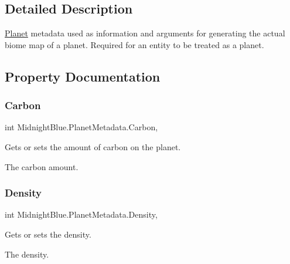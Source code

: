 \subsection{Detailed Description}
\hyperlink{class_midnight_blue_1_1_planet}{Planet} metadata used as information and arguments for generating the actual biome map of a planet. Required for an entity to be treated as a planet. 



\subsection{Property Documentation}
\hypertarget{class_midnight_blue_1_1_planet_metadata_abb8cb39cd167a260d08f505ad038eb90}{}\label{class_midnight_blue_1_1_planet_metadata_abb8cb39cd167a260d08f505ad038eb90} 
\subsubsection{\texorpdfstring{Carbon}{Carbon}}
{\footnotesize\ttfamily int Midnight\+Blue.\+Planet\+Metadata.\+Carbon\hspace{0.3cm}{\ttfamily [get]}, {\ttfamily [set]}}



Gets or sets the amount of carbon on the planet. 

The carbon amount.\hypertarget{class_midnight_blue_1_1_planet_metadata_a6f3fe53543f04e24f107c6464b03d885}{}\label{class_midnight_blue_1_1_planet_metadata_a6f3fe53543f04e24f107c6464b03d885} 
\subsubsection{\texorpdfstring{Density}{Density}}
{\footnotesize\ttfamily int Midnight\+Blue.\+Planet\+Metadata.\+Density\hspace{0.3cm}{\ttfamily [get]}, {\ttfamily [set]}}



Gets or sets the density. 

The density.\hypertarget{class_midnight_blue_1_1_planet_metadata_ada2ca7bb1b67a18098a2fadd7f958ec9}{}\label{class_midnight_blue_1_1_planet_metadata_ada2ca7bb1b67a18098a2fadd7f958ec9} 
